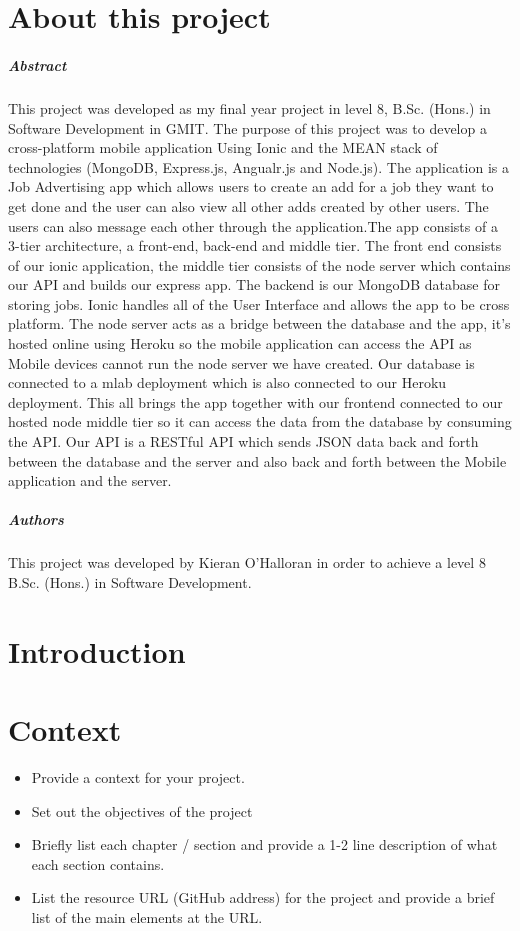 
\chapter*{About this project}
\paragraph{Abstract}
This project was developed as my final year project in level 8, B.Sc. (Hons.) in Software Development in GMIT. The purpose of this project was to develop a cross-platform mobile application Using Ionic and the MEAN stack of technologies (MongoDB, Express.js, Angualr.js and Node.js). The application is a Job Advertising app which allows users to create an add for a job they want to get done and the user can also view all other adds created by other users. The users can also message each other through the application.The app consists of a 3-tier architecture, a front-end, back-end and middle tier. The front end consists of our ionic application, the middle tier consists of the node server which contains our API and builds our express app. The backend is our MongoDB database for storing jobs. Ionic handles all of the User Interface and allows the app to be cross platform. The node server acts as a bridge between the database and the app, it’s hosted online using Heroku so the mobile application can access the API as Mobile devices cannot run the node server we have created. Our database is connected to a mlab deployment which is also connected to our Heroku deployment. This all brings the app together with our frontend connected to our hosted node middle tier so it can access the data from the database by consuming the API. Our API is a RESTful API which sends JSON data back and forth between the database and the server and also back and forth between the Mobile application and the server. 

\paragraph{Authors}
This project was developed by Kieran O'Halloran in order to achieve a level 8 B.Sc. (Hons.) in Software Development.


\chapter{Introduction}


\chapter{Context}
\begin{itemize}
\item Provide a context for your project.
\item Set out the objectives of the project
\item Briefly list each chapter / section and provide a 1-2 line description of what each section contains.
\item List the resource URL (GitHub address) for the project and provide a brief list of the main elements at the URL.
\end{itemize}

